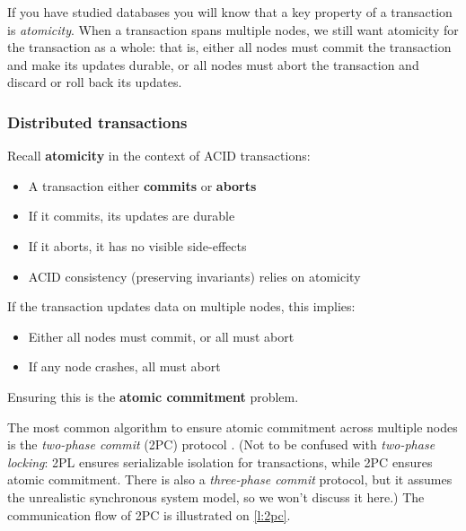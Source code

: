 If you have studied databases you will know that a key property of a transaction is \emph{atomicity}.
When a transaction spans multiple nodes, we still want atomicity for the transaction as a whole: that is, either all nodes must commit the transaction and make its updates durable, or all nodes must abort the transaction and discard or roll back its updates.

\begin{frame}
    \label{s:atomic-commit}
    \frametitle{Distributed transactions}
    Recall \textbf{atomicity} in the context of ACID transactions:
    \begin{itemize}
        \item A transaction either \textbf{commits} or \textbf{aborts}\pause
        \item If it commits, its updates are durable
        \item If it aborts, it has no visible side-effects\pause
        \item ACID consistency (preserving invariants) relies on atomicity\pause\\[1em]
    \end{itemize}
    If the transaction updates data on multiple nodes, this implies:
    \begin{itemize}
        \item Either all nodes must commit, or all must abort\pause
        \item If any node crashes, all must abort\\[1em]
    \end{itemize}
    Ensuring this is the \textbf{atomic commitment} problem.
\end{frame}
\label{l:atomic-commit}

The most common algorithm to ensure atomic commitment across multiple nodes is the \emph{two-phase commit} (2PC) protocol \citep{Gray:1978}.
(Not to be confused with \emph{two-phase locking}: 2PL ensures serializable isolation for transactions, while 2PC ensures atomic commitment.
There is also a \emph{three-phase commit} protocol, but it assumes the unrealistic synchronous system model, so we won't discuss it here.)
The communication flow of 2PC is illustrated on \autoref{l:2pc}.

